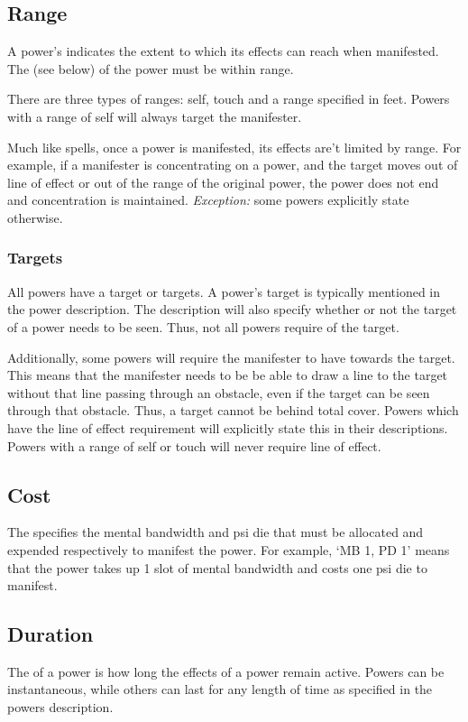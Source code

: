 \subsection{Range}
A power's  indicates the extent
to which its effects can reach when manifested.
The  (see below) of the power must be within range.

There are three types of ranges: self, touch and a range
specified in feet.
Powers with a range of self will always target the manifester.

Much like spells,
once a power is manifested,
its effects are't limited by range.
For example,
if a manifester is concentrating on a power,
and the target moves out of line of effect or out of
the range of the original power,
the power does not end and concentration is maintained.
\textit{Exception:} some powers explicitly state otherwise.

\subsubsection{Targets}
\label{subs:targets}
All powers have a target or targets.
A power's target is typically mentioned in the power description.
The description will also specify whether or not the target
of a power needs to be seen.
Thus, not all powers require  of the target.

Additionally, some powers will
require the manifester to have 
towards the target.
This means that the manifester needs to be be able to draw a line
to the target without that line passing through an obstacle,
even if the target can be seen through that obstacle.
Thus, a target cannot be behind total cover.
Powers which have the line of effect requirement
will explicitly state this in their descriptions.
Powers with a range of self or touch
will never require line of effect.

\subsection{Cost}
The  specifies the mental bandwidth and psi die
that must be allocated and expended respectively to manifest the power.
For example,
`MB 1, PD 1'
means that the power takes up 1 slot of mental bandwidth
and costs one psi die to manifest.

\subsection{Duration}
\label{sub:duration}
The  of a power is how long the effects
of a power remain active.
Powers can be instantaneous,
while others can last for any length of time
as specified in the powers description.


